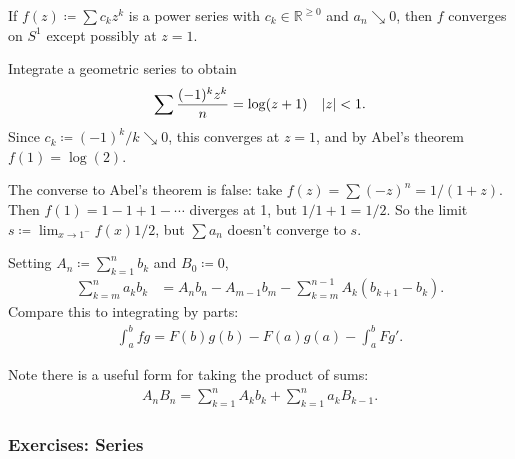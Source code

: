 \begin{lemma}

If \(f(z) \coloneqq\sum c_k z^k\) is a power series with
\(c_k \in {\mathbb{R}}^{\geq 0}\) and \(a_n\searrow 0\), then \(f\)
converges on \(S^1\) except possibly at \(z=1\).

\end{lemma}

\begin{example}

Integrate a geometric series to obtain
\begin{align*}
\sum {(-1)^k z^k \over n} = \log(z+1) && {\left\lvert {z} \right\rvert} < 1
.\end{align*}
Since \(c_k \coloneqq(-1)^k/k \searrow 0\), this converges at \(z=1\),
and by Abel's theorem \(f(1) = \log(2)\).

\end{example}

\begin{remark}

The converse to Abel's theorem is false: take
\(f(z) = \sum (-z)^n = 1/(1+z)\). Then \(f(1) = 1-1+1-\cdots\) diverges
at 1, but \(1/1+1 = 1/2\). So the limit
\(s\coloneqq\lim_{x\to 1^-} f(x) 1/2\), but \(\sum a_n\) doesn't
converge to \(s\).

\end{remark}

\begin{proposition}

Setting \(A_n \coloneqq\sum_{k=1}^n b_k\) and \(B_0 \coloneqq 0\),
\begin{align*}
\sum_{k=m}^n a_k b_k 
&= A_nb_n - A_{m-1} b_m - \sum_{k=m}^{n-1} A_k(b_{k+1} - b_{k})
.\end{align*}
Compare this to integrating by parts:
\begin{align*}
\int_a^b f g = F(b)g(b) - F(a)g(a) - \int_a^b Fg'
.\end{align*}

Note there is a useful form for taking the product of sums:
\begin{align*}
A_{n} B_{n}=\sum_{k=1}^{n} A_{k} b_{k}+\sum_{k=1}^{n} a_{k} B_{k-1}
.\end{align*}

\end{proposition}

\hypertarget{exercises-series}{%
\subsubsection{Exercises: Series}\label{exercises-series}}

